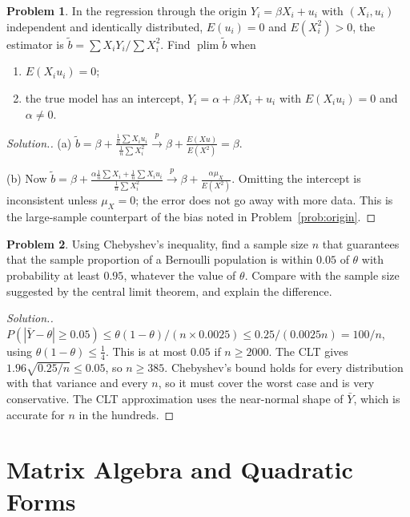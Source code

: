 \documentclass[11pt,a4paper]{article}
\numberwithin{equation}{section}
\DeclareMathOperator{\plim}{plim}
\theoremstyle{definition}
\newtheorem{problemx}{Problem}[subsection]
\newenvironment{problem}{\begin{problemx}}{\end{problemx}}
\newenvironment{solution}
  {\renewcommand{\qedsymbol}{}\begin{proof}[\textit{Solution}.]}
  {\end{proof}}
\begin{document}
\begin{problem}
In the regression through the origin $Y_i = \beta X_i + u_i$ with $(X_i, u_i)$ independent and identically distributed, $E(u_i) = 0$ and
$E(X_i^2) > 0$, the estimator is $\tilde b = \sum X_iY_i/\sum X_i^2$. Find $\plim\tilde b$ when
\begin{enumerate}[label=(\alph*)]
\item $E(X_iu_i) = 0$;
\item the true model has an intercept, $Y_i = \alpha + \beta X_i + u_i$ with $E(X_iu_i) = 0$ and $\alpha \neq 0$.
\end{enumerate}
\end{problem}

\begin{solution}
(a) $\tilde b = \beta + \frac{\frac1n\sum X_iu_i}{\frac1n\sum X_i^2} \xrightarrow{p} \beta + \frac{E(Xu)}{E(X^2)} = \beta$.

(b) Now $\tilde b = \beta + \frac{\alpha\frac1n\sum X_i + \frac1n\sum X_iu_i}{\frac1n\sum X_i^2} \xrightarrow{p} \beta + \frac{\alpha\mu_X}{E(X^2)}$. Omitting the intercept is
inconsistent unless $\mu_X = 0$; the error does not go away with more data. This is the large-sample counterpart of the bias noted in
Problem~\ref{prob:origin}.
\end{solution}

\begin{problem}
Using Chebyshev's inequality, find a sample size $n$ that guarantees that the sample proportion of a Bernoulli population is within $0.05$ of $\theta$
with probability at least $0.95$, whatever the value of $\theta$. Compare with the sample size suggested by the central limit theorem, and explain the
difference.
\end{problem}

\begin{solution}
$P(|\bar Y - \theta| \geq 0.05) \leq \theta(1 - \theta)/(n \times 0.0025) \leq 0.25/(0.0025n) = 100/n$, using $\theta(1 - \theta) \leq \frac14$. This is at most $0.05$ if
$n \geq 2000$. The CLT gives $1.96\sqrt{0.25/n} \leq 0.05$, so $n \geq 385$. Chebyshev's bound holds for every distribution with that variance and every
$n$, so it must cover the worst case and is very conservative. The CLT approximation uses the near-normal shape of $\bar Y$, which is accurate for
$n$ in the hundreds.
\end{solution}

\section{Matrix Algebra and Quadratic Forms}
\label{sec:quad}
\end{document}
